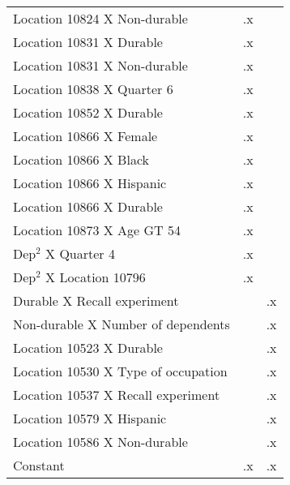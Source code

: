 \begin{tabular}{l*{2}{c}}
Location 10824 X Non-durable&          .x&            \\
Location 10831 X Durable&          .x&            \\
Location 10831 X Non-durable&          .x&            \\
Location 10838 X Quarter 6&          .x&            \\
Location 10852 X Durable&          .x&            \\
Location 10866 X Female&          .x&            \\
Location 10866 X Black&          .x&            \\
Location 10866 X Hispanic&          .x&            \\
Location 10866 X Durable&          .x&            \\
Location 10873 X Age GT 54&          .x&            \\
Dep$^2$ X Quarter 4 &          .x&            \\
Dep$^2$ X Location 10796&          .x&            \\
Durable X Recall experiment&            &          .x\\
Non-durable X Number of dependents&            &          .x\\
Location 10523 X Durable&            &          .x\\
Location 10530 X Type of occupation&            &          .x\\
Location 10537 X Recall experiment&            &          .x\\
Location 10579 X Hispanic&            &          .x\\
Location 10586 X Non-durable&            &          .x\\
Constant            &          .x&          .x\\
\hline\hline
\end{tabular}
